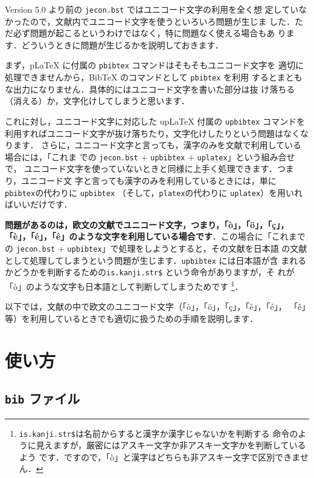 \documentclass[article]{jlreq}
\begin{document}
Version 5.0 より前の \texttt{jecon.bst} ではユニコード文字の利用を全く想
定していなかったので，文献内でユニコード文字を使うといろいろ問題が生じま
した．ただ必ず問題が起こるというわけではなく，特に問題なく使える場合もあ
ります．どういうときに問題が生じるかを説明しておきます．

\vspace*{1em}

まず，pLaTeX に付属の \texttt{pbibtex} コマンドはそもそもユニコード文字を
適切に処理できませんから，BibTeX のコマンドとして \texttt{pbibtex} を利用
するとまともな出力になりません．具体的にはユニコード文字を書いた部分は抜
け落ちる（消える）か，文字化けしてしまうと思います．

これに対し，ユニコード文字に対応した upLaTeX 付属の \texttt{upbibtex} コマンドを
利用すればユニコード文字が抜け落ちたり，文字化けしたりという問題はなくなります．
さらに，ユニコード文字と言っても，漢字のみを文献で利用している場合には，「これま
での \texttt{jecon.bst} + \texttt{upbibtex} + \texttt{uplatex}」という組み合せで，
ユニコード文字を使っていないときと同様に上手く処理できます．つまり，ユニコード文
字と言っても漢字のみを利用しているときには，単に \texttt{pbibtex}の代わりに
\texttt{upbibtex} （そして，\texttt{platex}の代わりに \texttt{uplatex}）を用いれ
ばいいだけです．

\textbf{問題があるのは，欧文の文献でユニコード文字，つまり，「ò」，「ö」，「ç」，
「è」，「é」，「ê」のような文字を利用している場合です}．この場合に「これまでの
\texttt{jecon.bst} + \texttt{upbibtex}」で処理をしようとすると，その文献を日本語
の文献として処理してしまうという問題が生じます．\texttt{upbibtex} には日本語が含
まれるかどうかを判断するための\texttt{is.kanji.str\$} という命令がありますが，そ
れが「ò」のような文字も日本語として判断してしまうためです
\footnote{\texttt{is.kanji.str\$}は名前からすると漢字か漢字じゃないかを判断する
命令のように見えますが，厳密にはアスキー文字か非アスキー文字かを判断しているよう
です．ですので，「ò」と漢字はどちらも非アスキー文字で区別できません．}．

\vspace*{1em}

以下では，文献の中で欧文のユニコード文字（「ò」，「ö」，「ç」，「è」，「é」，
「ê」等）を利用しているときでも適切に扱うための手順を説明します．

\section{使い方}

\subsection{\texttt{bib} ファイル}
\end{document}

